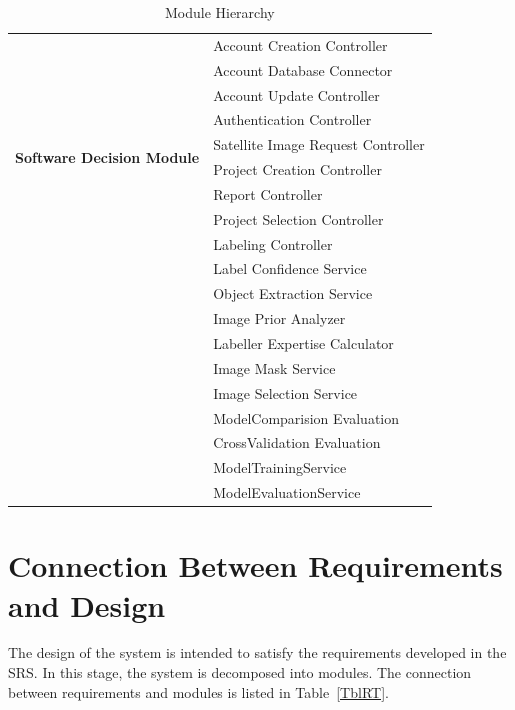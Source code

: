 \documentclass[12pt, titlepage]{article}
\begin{document}
\begin{table}[h!]
\begin{tabular}{p{} p{}}
  \multirow{10}{0.3\textwidth}{\textbf{Software Decision Module}} 
   & Account Creation Controller\\
   & Account Database Connector\\
   & Account Update Controller\\
   & Authentication Controller\\
   & Satellite Image Request Controller\\
   & Project Creation Controller\\
   & Report Controller\\
   & Project Selection Controller\\
   & Labeling Controller\\
   & Label Confidence Service\\
   & Object Extraction Service\\
   & Image Prior Analyzer\\
   & Labeller Expertise Calculator\\
   & Image Mask Service\\
   & Image Selection Service\\
   & ModelComparision Evaluation\\
   & CrossValidation Evaluation\\
   & ModelTrainingService\\
   & ModelEvaluationService\\
  \bottomrule
  \end{tabular}
  \caption{Module Hierarchy}
  \label{TblMH}
  \end{table}
  

\section{Connection Between Requirements and Design} \label{SecConnection}

The design of the system is intended to satisfy the requirements developed in
the SRS. In this stage, the system is decomposed into modules. The connection
between requirements and modules is listed in Table~\ref{TblRT}.
\end{document}

